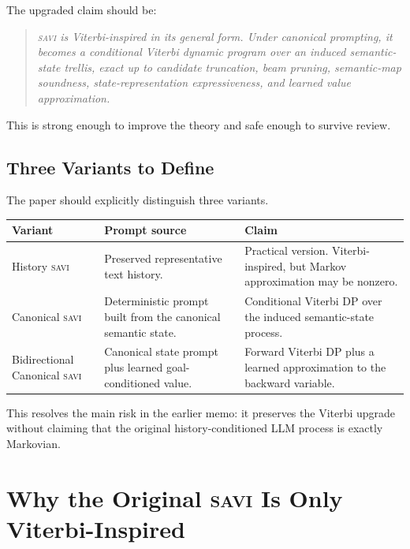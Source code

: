 \documentclass[11pt,letterpaper]{article}
\newcommand{\SAVI}{\textsc{savi}\xspace}
\begin{document}
The upgraded claim should be:

\begin{quote}
\itshape
\SAVI is Viterbi-inspired in its general form.
Under canonical prompting, it becomes a conditional Viterbi dynamic program over an induced
semantic-state trellis, exact up to candidate truncation, beam pruning, semantic-map soundness,
state-representation expressiveness, and learned value approximation.
\end{quote}

This is strong enough to improve the theory and safe enough to survive review.

\subsection{Three Variants to Define}

The paper should explicitly distinguish three variants.

\vspace{4pt}
\begin{center}
\small
\begin{tabularx}{\linewidth}{lXX}
\toprule
\textbf{Variant} & \textbf{Prompt source} & \textbf{Claim} \\
\midrule
History \SAVI
  & Preserved representative text history.
  & Practical version. Viterbi-inspired, but Markov approximation may be nonzero. \\
\addlinespace
Canonical \SAVI
  & Deterministic prompt built from the canonical semantic state.
  & Conditional Viterbi DP over the induced semantic-state process. \\
\addlinespace
Bidirectional Canonical \SAVI
  & Canonical state prompt plus learned goal-conditioned value.
  & Forward Viterbi DP plus a learned approximation to the backward variable. \\
\bottomrule
\end{tabularx}
\end{center}
\vspace{4pt}

This resolves the main risk in the earlier memo: it preserves the Viterbi upgrade without claiming that
the original history-conditioned LLM process is exactly Markovian.

\section{Why the Original \SAVI Is Only Viterbi-Inspired}
\end{document}
